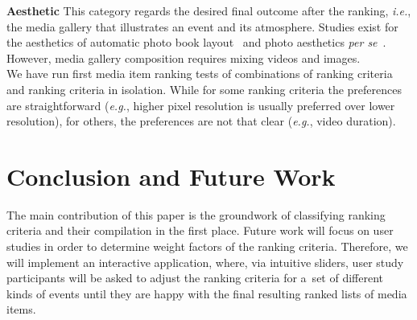 \documentclass[runningheads,a4paper,11pt]{llncs}
\begin{document}
\noindent \textbf{Aesthetic}
This category regards the desired final outcome after the ranking, \emph{i.e.},
the media gallery that illustrates an event and its atmosphere.
Studies exist for the aesthetics of
automatic photo book layout~\cite{Photo2011}
and photo aesthetics \emph{per se}~\cite{Photo2012}.
However, media gallery composition requires mixing videos and images.\\

\noindent We have run first media item ranking tests of combinations
of ranking criteria and ranking criteria in isolation.
While for some ranking criteria the preferences are straightforward
(\emph{e.g.}, higher pixel resolution is usually preferred over lower resolution),
for others, the preferences are not that clear (\emph{e.g.}, video duration).

\section{Conclusion and Future Work}
The main contribution of this paper is the groundwork of classifying ranking criteria
and their compilation in the first place.
Future work will focus on user studies in order to determine
weight factors of the ranking criteria.
Therefore, we will implement an interactive application,
where, via intuitive sliders, user study participants will be asked
to adjust the ranking criteria for a~set of different kinds of events
until they are happy with the final resulting ranked lists of media items.

\renewcommand{\ttdefault}{cmvtt}
\renewcommand\UrlFont\tt



\end{document}
